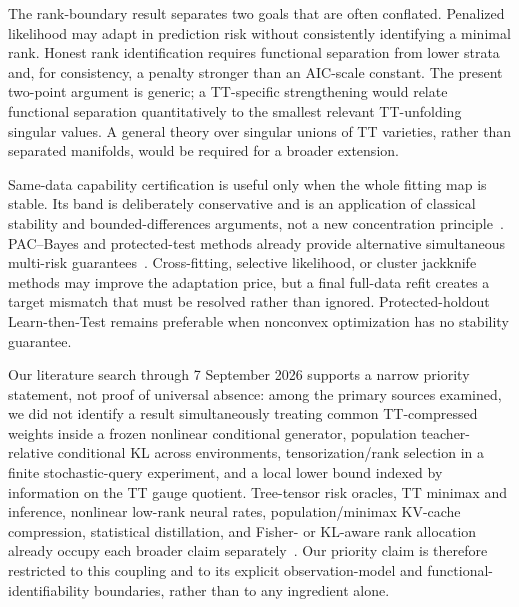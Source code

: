 The rank-boundary result separates two goals that are often conflated. Penalized likelihood may adapt in prediction risk without consistently identifying a minimal rank. Honest rank identification requires functional separation from lower strata and, for consistency, a penalty stronger than an AIC-scale constant. The present two-point argument is generic; a TT-specific strengthening would relate functional separation quantitatively to the smallest relevant TT-unfolding singular values. A general theory over singular unions of TT varieties, rather than separated manifolds, would be required for a broader extension.

Same-data capability certification is useful only when the whole fitting map is stable. Its band is deliberately conservative and is an application of classical stability and bounded-differences arguments, not a new concentration principle~\citep{bousquet2002stability,feldman2019stability,bousquet2020sharper}. PAC--Bayes and protected-test methods already provide alternative simultaneous multi-risk guarantees~\citep{adams2024multiple,angelopoulos2021ltt,laufer2023pareto}. Cross-fitting, selective likelihood, or cluster jackknife methods may improve the adaptation price, but a final full-data refit creates a target mismatch that must be resolved rather than ignored. Protected-holdout Learn-then-Test remains preferable when nonconvex optimization has no stability guarantee.

Our literature search through 7 September 2026 supports a narrow priority statement, not proof of universal absence: among the primary sources examined, we did not identify a result simultaneously treating common TT-compressed weights inside a frozen nonlinear conditional generator, population teacher-relative conditional KL across environments, tensorization/rank selection in a finite stochastic-query experiment, and a local lower bound indexed by information on the TT gauge quotient. Tree-tensor risk oracles, TT minimax and inference, nonlinear low-rank neural rates, population/minimax KV-cache compression, statistical distillation, and Fisher- or KL-aware rank allocation already occupy each broader claim separately~\citep{michel2022tree,zhou2022ttoi,qin2024ttregression,arunan2026lora,haverbeck2026kvcache,menon2021distillation,iosvd2026,laser2026}. Our priority claim is therefore restricted to this coupling and to its explicit observation-model and functional-identifiability boundaries, rather than to any ingredient alone.

